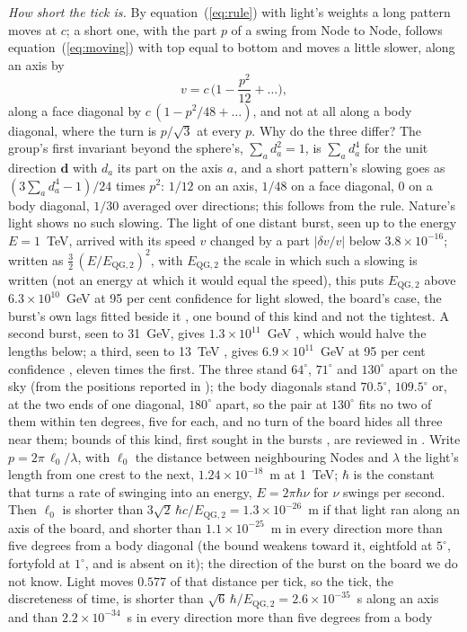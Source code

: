 \documentclass[pdflatex,sn-mathphys-num]{sn-jnl}
\begin{document}
\textit{How short the tick is.} By equation~(\ref{eq:rule}) with light's weights a long pattern moves at $c$; a short one, with the part $p$ of a swing from Node to Node, follows equation~(\ref{eq:moving}) with top equal to bottom and moves a little slower, along an axis by
\begin{equation}\label{eq:slow}
v = c\,\Big(1 - \frac{p^2}{12} + \dots\Big),
\end{equation}
along a face diagonal by $c\,(1 - p^2/48 + \dots)$, and not at all along a body diagonal, where the turn is $p/\sqrt3$ at every $p$. Why do the three differ? The group's first invariant beyond the sphere's, $\sum_a d_a^2 = 1$, is $\sum_a d_a^4$ for the unit direction $\mathbf d$ with $d_a$ its part on the axis $a$, and a short pattern's slowing goes as $(3\sum_a d_a^4 - 1)/24$ times $p^2$: $1/12$ on an axis, $1/48$ on a face diagonal, $0$ on a body diagonal, $1/30$ averaged over directions; this follows from the rule. Nature's light shows no such slowing. The light of one distant burst, seen up to the energy $E = 1$~TeV, arrived with its speed $v$ changed by a part $|\delta v/v|$ below $3.8 \times 10^{-16}$; written as $\tfrac32\,(E/E_{\mathrm{QG},2})^2$, with $E_{\mathrm{QG},2}$ the scale in which such a slowing is written (not an energy at which it would equal the speed), this puts $E_{\mathrm{QG},2}$ above $6.3 \times 10^{10}$~GeV at 95 per cent confidence for light slowed, the board's case, the burst's own lags fitted beside it \cite{acciari2020}, one bound of this kind and not the tightest. A second burst, seen to 31~GeV, gives $1.3 \times 10^{11}$~GeV \cite{vasileiou2013}, which would halve the lengths below; a third, seen to 13~TeV \cite{lhaaso2023b}, gives $6.9 \times 10^{11}$~GeV at 95 per cent confidence \cite{lhaaso2024}, eleven times the first. The three stand $64^\circ$, $71^\circ$ and $130^\circ$ apart on the sky (from the positions reported in \cite{acciari2020,vasileiou2013,lhaaso2023b}); the body diagonals stand $70.5^\circ$, $109.5^\circ$ or, at the two ends of one diagonal, $180^\circ$ apart, so the pair at $130^\circ$ fits no two of them within ten degrees, five for each, and no turn of the board hides all three near them; bounds of this kind, first sought in the bursts \cite{amelino1998}, are reviewed in \cite{mattingly2005}. Write $p = 2\pi\,\ell_0/\lambda$, with $\ell_0$ the distance between neighbouring Nodes and $\lambda$ the light's length from one crest to the next, $1.24 \times 10^{-18}$~m at 1~TeV; $\hbar$ is the constant that turns a rate of swinging into an energy, $E = 2\pi\hbar\nu$ for $\nu$ swings per second. Then $\ell_0$ is shorter than $3\sqrt2\,\hbar c/E_{\mathrm{QG},2} = 1.3 \times 10^{-26}$~m if that light ran along an axis of the board, and shorter than $1.1 \times 10^{-25}$~m in every direction more than five degrees from a body diagonal (the bound weakens toward it, eightfold at $5^\circ$, fortyfold at $1^\circ$, and is absent on it); the direction of the burst on the board we do not know. Light moves $0.577$ of that distance per tick, so the tick, the discreteness of time, is shorter than $\sqrt6\,\hbar/E_{\mathrm{QG},2} = 2.6 \times 10^{-35}$~s along an axis and than $2.2 \times 10^{-34}$~s in every direction more than five degrees from a body 
\end{document}
